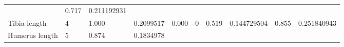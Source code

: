 \documentclass[11pt]{article}
\begin{document}
\begin{longtable}[]{@{}llllllllll@{}}
\begin{minipage}[t]{0.07\columnwidth}
\end{minipage} & \begin{minipage}[t]{0.07\columnwidth}\raggedright
0.717\strut
\end{minipage} & \begin{minipage}[t]{0.07\columnwidth}\raggedright
0.211192931\strut
\end{minipage}\tabularnewline
\begin{minipage}[t]{0.07\columnwidth}\raggedright
Tibia length\strut
\end{minipage} & \begin{minipage}[t]{0.07\columnwidth}\raggedright
4\strut
\end{minipage} & \begin{minipage}[t]{0.07\columnwidth}\raggedright
1.000\strut
\end{minipage} & \begin{minipage}[t]{0.07\columnwidth}\raggedright
0.2099517\strut
\end{minipage} & \begin{minipage}[t]{0.07\columnwidth}\raggedright
0.000\strut
\end{minipage} & \begin{minipage}[t]{0.07\columnwidth}\raggedright
0\strut
\end{minipage} & \begin{minipage}[t]{0.07\columnwidth}\raggedright
0.519\strut
\end{minipage} & \begin{minipage}[t]{0.07\columnwidth}\raggedright
0.144729504\strut
\end{minipage} & \begin{minipage}[t]{0.07\columnwidth}\raggedright
0.855\strut
\end{minipage} & \begin{minipage}[t]{0.07\columnwidth}\raggedright
0.251840943\strut
\end{minipage}\tabularnewline
\begin{minipage}[t]{0.07\columnwidth}\raggedright
Humerus length\strut
\end{minipage} & \begin{minipage}[t]{0.07\columnwidth}\raggedright
5\strut
\end{minipage} & \begin{minipage}[t]{0.07\columnwidth}\raggedright
0.874\strut
\end{minipage} & \begin{minipage}[t]{0.07\columnwidth}\raggedright
0.1834978\strut

\end{minipage}
\end{longtable}
\end{document}
